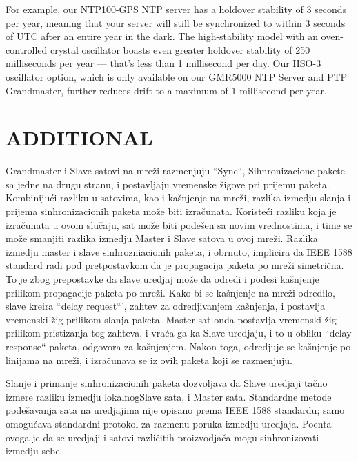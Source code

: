 \documentclass[a4paper,12pt, master]{etf}
\begin{document}
	For example, our NTP100-GPS NTP server has a holdover stability of 3 seconds per year, 
	meaning that your server will still be synchronized to within 3 seconds of UTC after an 
	entire year in the dark. The high-stability model with an oven-controlled crystal 
	oscillator boasts even greater holdover stability of 250 milliseconds per year — that's 
	less than 1 millisecond per day. Our HSO-3 oscillator option, which is only available on 
	our GMR5000 NTP Server and PTP Grandmaster, further reduces drift to a maximum of 1 
	millisecond per year. 

	\newpage

	\chapter{ADDITIONAL}
    
	Grandmaster i Slave satovi na mre\v{z}i razmenjuju ``Sync``, Sihnronizacione pakete sa jedne na 
	drugu stranu, i postavljaju vremenske \v{z}igove pri prijemu paketa. Kombiniju\'{c}i razliku u 
	satovima, kao i ka\v{s}njenje na mre\v{z}i, razlika izmedju slanja i prijema sinhronizacionih 
	paketa mo\v{z}e biti izra\v{c}unata. Koriste\'{c}i razliku koja je izra\v{c}unata u ovom slu\v{c}aju, sat 
	mo\v{z}e biti pode\v{s}en sa novim vrednostima, i time se mo\v{z}e smanjiti razlika izmedju Master i 
	Slave satova u ovoj mre\v{z}i. Razlika izmedju master i slave sinhrozniacionih paketa, i 
	obrnuto, implicira da IEEE 1588 standard radi pod pretpostavkom da je propagacija paketa 
	po mre\v{z}i simetri\v{c}na. To je zbog prepostavke da slave uredjaj mo\v{z}e da odredi i podesi 
	ka\v{s}njenje prilikom propagacije paketa po mre\v{z}i. Kako bi se ka\v{s}njenje na mre\v{z}i odredilo, 
	slave kreira ``delay request``', zahtev za odredjivanjem ka\v{s}njenja, i postavlja vremenski 
	\v{z}ig prilikom slanja paketa. Master sat onda postavlja vremenski \v{z}ig prilikom pristizanja 
	tog zahteva, i vra\'{c}a ga ka Slave uredjaju, i to u obliku ``delay response`` paketa, 
	odgovora za ka\v{s}njenjem. Nakon toga, odredjuje se ka\v{s}njenje po linijama na mre\v{z}i, i 
	izra\v{c}unava se iz ovih paketa koji se razmenjuju.
	
	Slanje i primanje sinhronizacionih paketa dozvoljava da Slave uredjaji ta\v{c}no izmere 
	razliku izmedju lokalnog\/Slave sata, i Master sata. Standardne metode pode\v{s}avanja sata na 
	uredjajima nije opisano prema IEEE 1588 standardu; samo omogu\'{c}ava standardni protokol za 
	razmenu poruka izmedju uredjaja. Poenta ovoga je da se uredjaji i satovi razli\v{c}itih 
	proizvodja\v{c}a mogu sinhronizovati izmedju sebe.
	
\end{document}
